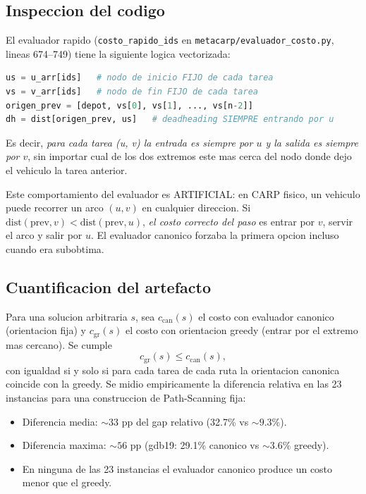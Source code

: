 \subsection{Inspeccion del codigo}

El evaluador rapido (\texttt{costo\_rapido\_ids} en
\texttt{metacarp/evaluador\_costo.py}, lineas 674--749) tiene la
siguiente logica vectorizada:

\begin{lstlisting}[language=Python]
us = u_arr[ids]   # nodo de inicio FIJO de cada tarea
vs = v_arr[ids]   # nodo de fin FIJO de cada tarea
origen_prev = [depot, vs[0], vs[1], ..., vs[n-2]]
dh = dist[origen_prev, us]   # deadheading SIEMPRE entrando por u
\end{lstlisting}

Es decir, \emph{para cada tarea (u, v) la entrada es siempre por $u$ y
la salida es siempre por $v$}, sin importar cual de los dos extremos
este mas cerca del nodo donde dejo el vehiculo la tarea anterior.

Este comportamiento del evaluador es ARTIFICIAL: en CARP fisico, un
vehiculo puede recorrer un arco $(u, v)$ en cualquier direccion. Si
$\mathrm{dist}(\text{prev}, v) < \mathrm{dist}(\text{prev}, u)$,
\emph{el costo correcto del paso} es entrar por $v$, servir el arco y
salir por $u$. El evaluador canonico forzaba la primera opcion incluso
cuando era subobtima.

\subsection{Cuantificacion del artefacto}

Para una solucion arbitraria $s$, sea $c_{\text{can}}(s)$ el costo
con evaluador canonico (orientacion fija) y $c_{\text{gr}}(s)$ el
costo con orientacion greedy (entrar por el extremo mas cercano). Se
cumple
\[ c_{\text{gr}}(s) \le c_{\text{can}}(s), \]
con igualdad si y solo si para cada tarea de cada ruta la orientacion
canonica coincide con la greedy. Se midio empiricamente la diferencia
relativa en las 23 instancias para una construccion de Path-Scanning
fija:

\begin{itemize}
\item Diferencia media: $\sim 33$ pp del gap relativo (32.7\% vs
  $\sim 9.3\%$).
\item Diferencia maxima: $\sim 56$ pp (gdb19: 29.1\% canonico vs
  $\sim 3.6\%$ greedy).
\item En ninguna de las 23 instancias el evaluador canonico produce
  un costo menor que el greedy.
\end{itemize}

